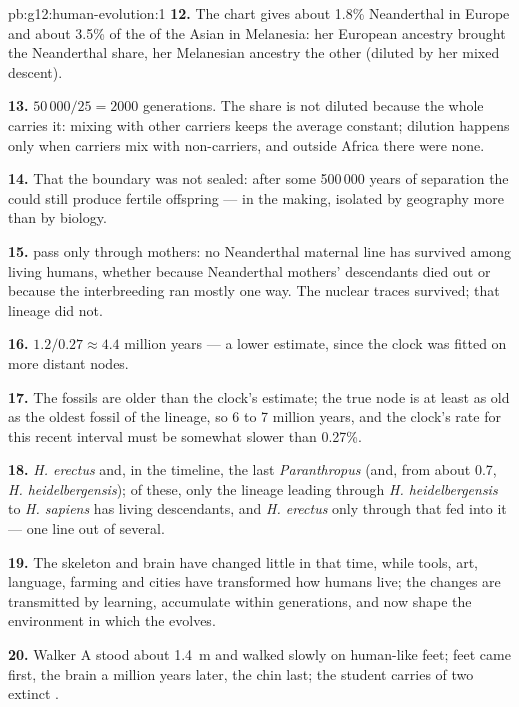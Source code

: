 \begin{solution}{pb:g12:human-evolution:1}
\textbf{12.} The chart gives about 1.8\% Neanderthal in Europe and
about 3.5\% of the  of the Asian  in Melanesia: her European ancestry
brought the Neanderthal share, her Melanesian ancestry the other
(diluted by her mixed descent).

\textbf{13.} $50\,000/25 = 2000$ generations. The share is not diluted
because the whole  carries it: mixing with other carriers
keeps the average constant; dilution happens only when carriers mix
with non-carriers, and outside Africa there were none.

\textbf{14.} That the boundary was not sealed: after some 500\,000
years of separation the  could still produce fertile
offspring ---  in the making, isolated by geography more than
by biology.

\textbf{15.}  pass only through mothers: no Neanderthal
maternal line has survived among living humans, whether because
Neanderthal mothers' descendants died out or because the interbreeding
ran mostly one way. The nuclear traces survived; that lineage did not.

\textbf{16.} $1.2/0.27 \approx 4.4$ million years --- a lower estimate,
since the clock was fitted on more distant nodes.

\textbf{17.} The fossils are older than the clock's estimate; the true
node is at least as old as the oldest fossil of the lineage, so 6 to 7
million years, and the clock's rate for this recent interval must be
somewhat slower than 0.27\%.

\textbf{18.} \emph{H. erectus} and, in the timeline, the last
\emph{Paranthropus} (and, from about 0.7, \emph{H. heidelbergensis});
of these, only the lineage leading through \emph{H. heidelbergensis}
to \emph{H. sapiens} has living descendants, and \emph{H. erectus}
only through  that fed into it --- one line out of several.

\textbf{19.} The skeleton and brain have changed little in that time,
while tools, art, language, farming and cities have transformed how
humans live; the changes are transmitted by learning, accumulate
within generations, and now shape the environment in which the 
evolves.

\textbf{20.} Walker A stood about \qty{1.4}{m} and walked slowly on
human-like feet; feet came first, the brain a million years later, the
chin last; the student carries  of two extinct .
\end{solution}

